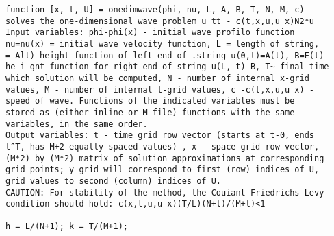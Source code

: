 \documentclass[../main.tex]{subfiles}
\begin{document}
\begin{lstlisting}[numbers=none,frame=none]
function [x, t, U] = onedimwave(phi, nu, L, A, B, T, N, M, c) 
solves the one-dimensional wave problem u tt - c(t,x,u,u x)N2*u 
Input variables: phi-phi(x) - initial wave profilo function 
nu=nu(x) = initial wave velocity function, L = length of string, 
= Alt) height function of left end of .string u(0,t)=A(t), B=E(t) 
he i gnt function for right end of string u(L, t)-B, T~ final time 
which solution will be computed, N - number of internal x-grid 
values, M - number of internal t-grid values, c -c(t,x,u,u x) -
speed of wave. Functions of the indicated variables must be 
stored as (either inline or M-file) functions with the same 
variables, in the same order. 
Output variables: t - time grid row vector (starts at t-0, ends 
t^T, has M+2 equally spaced values) , x - space grid row vector, 
(M*2) by (M*2) matrix of solution approximations at corresponding 
grid points; y grid will correspond to first (row) indices of U, 
grid values to second (column) indices of U. 
CAUTION: For stability of the method, the Couiant-Friedrichs-Levy 
condition should hold: c(x,t,u,u x)(T/L)(N+l)/(M+l)<1 

h = L/(N+1); k = T/(M+1); 
\end{lstlisting}
\end{document}
